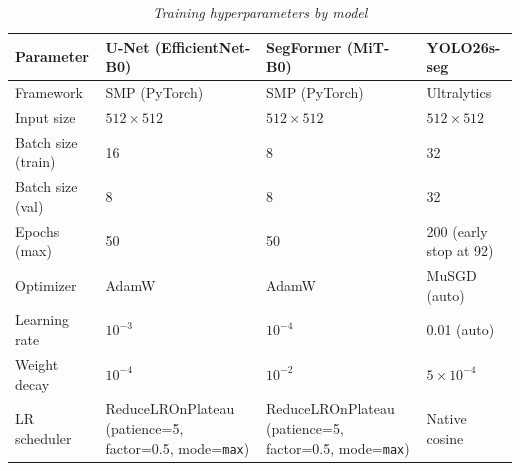 \begin{table}[htbp]
    \centering
    \caption{\textit{Training hyperparameters by model}}
    \label{tab:training-hyperparameters}
    \scriptsize
    \setlength{\tabcolsep}{3pt}
    \begin{tabularx}{\textwidth}{lXXX}
        \hline
        \textbf{Parameter}    & \textbf{U-Net (EfficientNet-B0)}                              & \textbf{SegFormer (MiT-B0)}                                   & \textbf{YOLO26s-seg}           \\
        \hline
        Framework             & SMP (PyTorch)                                                 & SMP (PyTorch)                                                 & Ultralytics                    \\
        Input size            & $512 \times 512$                                              & $512 \times 512$                                              & $512 \times 512$               \\
        Batch size (train)    & 16                                                            & 8                                                             & 32                             \\
        Batch size (val)      & 8                                                             & 8                                                             & 32                             \\
        Epochs (max)          & 50                                                            & 50                                                            & 200 (early stop at 92)         \\
        Optimizer             & AdamW                                                         & AdamW                                                         & MuSGD (auto)                   \\
        Learning rate         & $10^{-3}$                                                     & $10^{-4}$                                                     & 0.01 (auto)                    \\
        Weight decay          & $10^{-4}$                                                     & $10^{-2}$                                                     & $5 \times 10^{-4}$             \\
        LR scheduler          & ReduceLROnPlateau (patience=5, factor=0.5, mode=\texttt{max}) & ReduceLROnPlateau (patience=5, factor=0.5, mode=\texttt{max}) & Native cosine                  \\

\end{tabularx}
\end{table}
